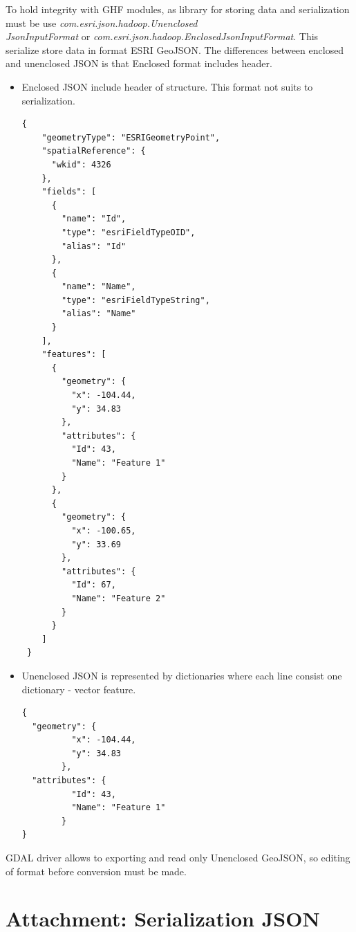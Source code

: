 \documentclass[a4paper,12pt,oneside]{report}
\begin{document}
		To hold integrity with GHF modules, as library for storing data and
	serialization must be use
	\textit{com.esri.json.hadoop.Unenclosed\\JsonInputFormat} or
	\textit{com.esri.json.hadoop.EnclosedJsonInputFormat}. This serialize store data
	in format ESRI GeoJSON. The differences between enclosed and unenclosed JSON is that 
	Enclosed format includes header.\cite{ESRI_serde}
	\begin{itemize}
	\item Enclosed JSON include header of structure. This format not suits to
	serialization.
		\begin{footnotesize}
			\begin{lstlisting}[style=python]
{
    "geometryType": "ESRIGeometryPoint",
    "spatialReference": {
      "wkid": 4326
    },
    "fields": [
      {
        "name": "Id",
        "type": "esriFieldTypeOID",
        "alias": "Id"
      },
      {
        "name": "Name",
        "type": "esriFieldTypeString",
        "alias": "Name"
      }
    ],
    "features": [
      {
        "geometry": {
          "x": -104.44,
          "y": 34.83
        },
        "attributes": {
          "Id": 43,
          "Name": "Feature 1"
        }
      },
      {
        "geometry": {
          "x": -100.65,
          "y": 33.69
        },
        "attributes": {
          "Id": 67,
          "Name": "Feature 2"
        }
      }
    ]
 }
			\end{lstlisting}
		\end{footnotesize}
	\item Unenclosed JSON is represented by dictionaries where each line consist one
	dictionary - vector feature.
		\begin{footnotesize}
			\begin{lstlisting}[style=python]
{
  "geometry": {
          "x": -104.44,
          "y": 34.83
        },
  "attributes": {
          "Id": 43,
          "Name": "Feature 1"
        }
}
			\end{lstlisting}
		\end{footnotesize}
	
	\end{itemize}
	GDAL driver allows to exporting and read only Unenclosed GeoJSON, so editing of format
	before conversion must be made.




\newpage	
		
	\section{Attachment: Serialization JSON}\label{serde}
	
\end{document}
